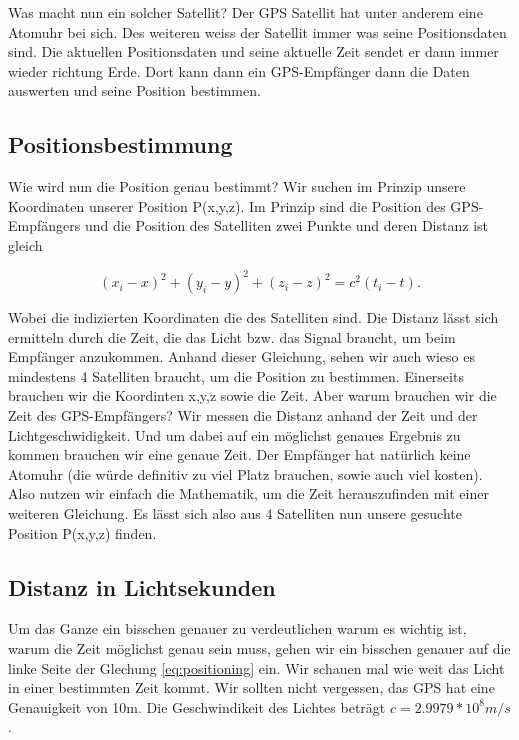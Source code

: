 \begin{refsection}
Was macht nun ein solcher Satellit? Der GPS Satellit hat unter anderem eine Atomuhr bei sich. Des weiteren weiss der Satellit immer was seine Positionsdaten sind. Die aktuellen Positionsdaten und seine aktuelle Zeit sendet er dann immer wieder richtung Erde. Dort kann dann ein GPS-Empfänger dann die Daten auswerten und seine Position bestimmen.

\subsection{Positionsbestimmung}
Wie wird nun die Position genau bestimmt? Wir suchen im Prinzip unsere Koordinaten unserer Position P(x,y,z). Im Prinzip sind die Position des GPS-Empfängers und die Position des Satelliten zwei Punkte und deren Distanz ist gleich

\begin{equation}
\label{eq:positioning}
    (x_i-x)^2 + (y_i-y)^2 + (z_i-z)^2 = c^2 (t_i -t).
\end{equation}

\noindent{}Wobei die indizierten Koordinaten die des Satelliten sind. Die Distanz lässt sich ermitteln durch die Zeit, die das Licht bzw. das Signal braucht, um beim Empfänger anzukommen. 
Anhand dieser Gleichung, sehen wir auch wieso es mindestens 4 Satelliten braucht, um die Position zu bestimmen. Einerseits brauchen wir die Koordinten x,y,z sowie die Zeit. Aber warum brauchen wir die Zeit des GPS-Empfängers? Wir messen die Distanz anhand der Zeit und der Lichtgeschwidigkeit. Und um dabei auf ein möglichst genaues Ergebnis zu kommen brauchen wir eine genaue Zeit. Der Empfänger hat natürlich keine Atomuhr (die würde definitiv zu viel Platz brauchen, sowie auch viel kosten). Also nutzen wir einfach die Mathematik, um die Zeit herauszufinden mit einer weiteren Gleichung. Es lässt sich also aus 4 Satelliten nun unsere gesuchte Position P(x,y,z) finden. 

\subsection{Distanz in Lichtsekunden}
Um das Ganze ein bisschen genauer zu verdeutlichen warum es wichtig ist, warum die Zeit möglichst genau sein muss, gehen wir ein bisschen genauer auf die linke Seite der Glechung \ref{eq:positioning} ein. Wir schauen mal wie weit das Licht in einer bestimmten Zeit kommt. Wir sollten nicht vergessen, das GPS hat eine Genauigkeit von 10m. Die Geschwindikeit des Lichtes beträgt  \(c = 2.9979 * 10^8 m/s\). \\


\end{refsection}
